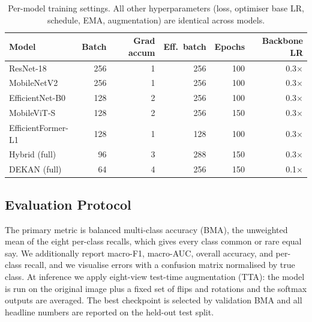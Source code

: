 \begin{table}[!t]
\centering
\caption{Per-model training settings. All other hyperparameters (loss, optimiser
base LR, schedule, EMA, augmentation) are identical across models.}
\label{tab:traincfg}
\begin{tabular}{lrrrrr}
\toprule
Model & Batch & Grad accum & Eff.\ batch & Epochs & Backbone LR \\
\midrule
ResNet-18           & 256 & 1 & 256 & 100 & 0.3$\times$ \\
MobileNetV2         & 256 & 1 & 256 & 100 & 0.3$\times$ \\
EfficientNet-B0     & 128 & 2 & 256 & 100 & 0.3$\times$ \\
MobileViT-S         & 128 & 2 & 256 & 150 & 0.3$\times$ \\
EfficientFormer-L1  & 128 & 1 & 128 & 100 & 0.3$\times$ \\
Hybrid (full)       & 96  & 3 & 288 & 150 & 0.3$\times$ \\
DEKAN (full)        & 64  & 4 & 256 & 150 & 0.1$\times$ \\
\bottomrule
\end{tabular}
\end{table}

\subsection{Evaluation Protocol}

The primary metric is balanced multi-class accuracy (BMA), the unweighted mean of
the eight per-class recalls, which gives every class common or rare equal
say. We additionally report macro-F1, macro-AUC, overall accuracy, and per-class
recall, and we visualise errors with a confusion matrix normalised by true class.
At inference we apply eight-view test-time augmentation (TTA): the model is run
on the original image plus a fixed set of flips and rotations and the softmax
outputs are averaged. The best checkpoint is selected by validation BMA and all
headline numbers are reported on the held-out test split.
